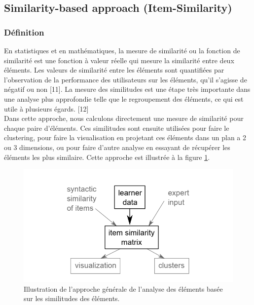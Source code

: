 \subsection{Similarity-based approach (Item-Similarity)}
\subsubsection{Définition}
En statistiques et en mathématiques, la mesure de similarité ou la fonction de similarité est une fonction à valeur réelle qui mesure la similarité entre deux éléments. Les valeurs de similarité entre les éléments sont quantifiées par l'observation de la performance des utilisateurs sur les éléments, qu'il s'agisse de négatif ou non [11]. La mesure des similitudes est une étape très importante dans une analyse plus approfondie telle que le regroupement des éléments, ce qui est utile à plusieurs égards. [12]  \\
Dans cette approche, nous calculons directement une mesure de similarité pour chaque paire d'éléments. Ces similitudes sont ensuite utilisées pour faire le clustering, pour faire la visualisation en projetant ces éléments dans un plan a 2 ou 3 dimensions, ou pour faire d’autre analyse en essayant de récupérer les éléments les plus similaire. Cette approche est illustrée à la figure \ref{illustration_item_similarity}. 

\begin{figure}[H]
	\begin{center}
		\includegraphics[width=\textwidth]{images/chapitre3/Illustration_item_smilarity.png}
	\end{center}
\caption{Illustration de l'approche générale de l'analyse des éléments basée sur les similitudes des éléments.}
\label{illustration_item_similarity}
\end{figure}

